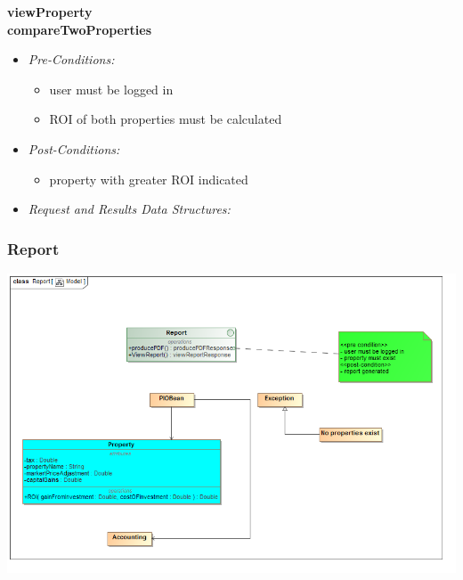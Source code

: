 \documentclass[a4paper,12pt]{article}
\begin{document}
\textbf{{viewProperty}}\\
\textbf{{compareTwoProperties}}
	\begin{itemize}
		\item \textit{Pre-Conditions:}
		\begin{itemize}
			\item user must be logged in
			\item ROI of both properties must be calculated
		\end{itemize}
		\item \textit{Post-Conditions:}
		\begin{itemize}
			\item property with greater ROI indicated
		\end{itemize}
		\item \textit{Request and Results Data Structures:}
	\end{itemize}

\subsubsection{Report}
\includegraphics[width=1\textwidth]{./Images/newDiagrams/serviceContract/ReportServiceContract.png}

\end{document}
